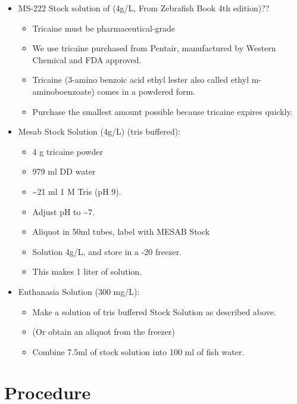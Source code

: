 \documentclass[
  letterpaper,
  DIV=11,
  numbers=noendperiod]{scrreprt}
\providecommand{\tightlist}{%
  \setlength{\itemsep}{0pt}\setlength{\parskip}{0pt}}\usepackage{longtable,booktabs,array}
\begin{document}
\begin{itemize}
\tightlist
\item
  MS-222 Stock solution of (4g/L, From Zebrafish Book 4th edition)??

  \begin{itemize}
  \tightlist
  \item
    Tricaine must be pharmaceutical-grade
  \item
    We use tricaine purchased from Pentair, manufactured by Western
    Chemical and FDA approved.
  \item
    Tricaine (3-amino benzoic acid ethyl lester also called ethyl
    m-aminoboenzoate) comes in a powdered form.
  \item
    Purchase the smallest amount possible because tricaine expires
    quickly.
  \end{itemize}
\item
  Mesab Stock Solution (4g/L) (tris buffered):

  \begin{itemize}
  \tightlist
  \item
    4 g tricaine powder
  \item
    979 ml DD water
  \item
    \textasciitilde21 ml 1 M Tris (pH 9).
  \item
    Adjust pH to \textasciitilde7.
  \item
    Aliquot in 50ml tubes, label with MESAB Stock
  \item
    Solution 4g/L, and store in a -20 freezer.
  \item
    This makes 1 liter of solution.
  \end{itemize}
\item
  Euthanasia Solution (300 mg/L):

  \begin{itemize}
  \tightlist
  \item
    Make a solution of tris buffered Stock Solution as described above.
  \item
    (Or obtain an aliquot from the freezer)
  \item
    Combine 7.5ml of stock solution into 100 ml of fish water.
  \end{itemize}
\end{itemize}

\hypertarget{procedure-35}{%
\section{Procedure}\label{procedure-35}}
\end{document}
